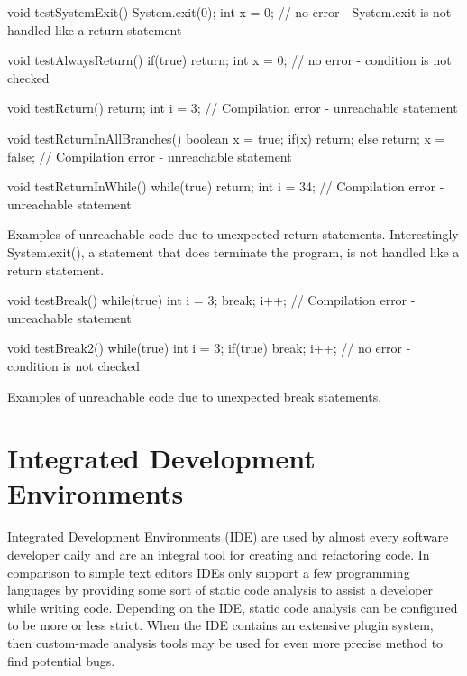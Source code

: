 \begin{program}[h!]
	\begin{JavaCode}
void testSystemExit() {
	System.exit(0);
	int x = 0; // no error - System.exit is not handled like a return statement
}

void testAlwaysReturn() {
	if(true) return;
	int x = 0; // no error - condition is not checked
}

void testReturn() {
	return;
	int i = 3; // Compilation error - unreachable statement
}

void testReturnInAllBranches() {
	boolean x = true;
	if(x) return;
	else return;
	x = false; // Compilation error - unreachable statement
}

void testReturnInWhile() {
	while(true) {
		return;
	}
	int i = 34; // Compilation error - unreachable statement
}\end{JavaCode}
	\caption{Examples of unreachable code due to unexpected return statements. Interestingly System.exit(), a statement that does terminate the program, is not handled like a return statement.}
	\label{code:Java unexpected return}
\end{program}

\begin{program}[h!]
	\begin{JavaCode}
void testBreak() {
	while(true) {
		int i = 3;
		break; 
		i++; // Compilation error - unreachable statement
	}
}

void testBreak2() {
	while(true) {
		int i = 3;
		if(true) break; 
		i++; // no error - condition is not checked
	}
}\end{JavaCode}
	\caption{Examples of unreachable code due to unexpected break statements.}
	\label{code:Java unexpected break}
\end{program}


\clearpage
\pagebreak
\section{Integrated Development Environments}
\label{sec:intelliJ}
Integrated Development Environments (IDE) are used by almost every software developer daily and are an integral tool for creating and refactoring code.
In comparison to simple text editors IDEs only support a few programming languages by providing some sort of static code analysis to assist a developer while writing code. 
Depending on the IDE, static code analysis can be configured to be more or less strict. 
When the IDE contains an extensive plugin system, then custom-made analysis tools may be used for even more precise method to find potential bugs.



